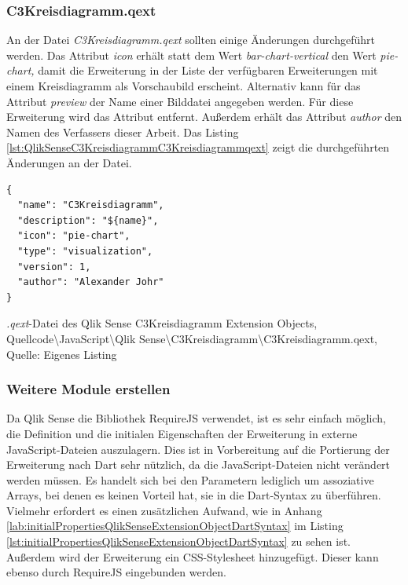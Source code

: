 \subsubsection{C3Kreisdiagramm.qext}


An der Datei \textit{C3Kreisdiagramm.qext} sollten einige Änderungen durchgeführt werden. Das Attribut \textit{icon} erhält statt dem Wert \textit{bar-chart-vertical} den Wert \textit{pie-chart,} damit die Erweiterung in der Liste der verfügbaren Erweiterungen mit einem Kreisdiagramm als Vorschaubild erscheint. Alternativ kann für das Attribut \textit{preview} der Name einer Bild\-datei angegeben werden. Für diese Erweiterung wird das Attribut entfernt. Außerdem erhält das Attribut \textit{author} den Namen des Verfassers dieser Arbeit. Das Listing \ref{lst:QlikSenseC3KreisdiagrammC3Kreisdiagrammqext} zeigt die durchgeführten Änderungen an der Datei.

\ifIncludeFigures\begin{listing}[htbp]
\begin{verbatim}
{
  "name": "C3Kreisdiagramm",
  "description": "${name}",
  "icon": "pie-chart",
  "type": "visualization",
  "version": 1,
  "author": "Alexander Johr"
}
\end{verbatim}
\caption[\textit{.qext}-Datei des Qlik Sense C3Kreisdiagramm Extension Objects]{\textit{.qext}-Datei des Qlik Sense C3Kreisdiagramm Extension Objects, \\Quellcode\textbackslash{}JavaScript\textbackslash{}Qlik Sense\textbackslash{}C3Kreisdiagramm\textbackslash{}C3Kreisdiagramm.qext, \\Quelle: Eigenes Listing}
\label{lst:QlikSenseC3KreisdiagrammC3Kreisdiagrammqext}
\end{listing}\fi

\subsubsection{Weitere Module erstellen}
\label{lab:QlikSenseWeitereModuleErstellen} 

Da Qlik Sense die Bibliothek RequireJS verwendet, ist es sehr einfach möglich, die Definition und die initialen Eigenschaften der Erweiterung in externe JavaScript-Dateien auszulagern. Dies ist in Vorbereitung auf die Portierung der Erweiterung nach Dart sehr nützlich, da die JavaScript-Dateien nicht verändert werden müssen. Es handelt sich bei den Parametern lediglich um assoziative Arrays, bei denen es keinen Vorteil hat, sie in die Dart-Syntax zu überführen. Vielmehr erfordert es einen zusätzlichen Aufwand, wie in Anhang \ref{lab:initialPropertiesQlikSenseExtensionObjectDartSyntax} im Listing \ref{lst:initialPropertiesQlikSenseExtensionObjectDartSyntax} zu sehen ist. Außerdem wird der Erweiterung ein CSS-Stylesheet hinzugefügt. Dieser kann ebenso durch RequireJS eingebunden werden.


